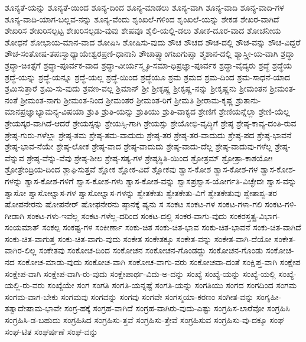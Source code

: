 {ಶೂನ್ಯತೆ-ಯನ್ನು
ಶೂನ್ಯತೆ-ಯಿಂದ
ಶೂನ್ಯ-ದಿಂದ
ಶೂನ್ಯ-ಮಾಡಲು
ಶೂನ್ಯ-ವಾಗಿ
ಶೂನ್ಯ-ವಾದಿ
ಶೂನ್ಯ-ವಾದಿ-ಗಳ
ಶೂನ್ಯ-ವಾದಿ-ಯಾಗ-ಬಲ್ಲವ-ನನ್ನು
ಶೂನ್ಯ-ವೆಂದು
ಶೃಂಖಲೆ-ಗಳಿಂದ
ಶೃಂಖಲೆ-ಯನ್ನು
ಶೇಕಡ
ಶೇಖರ-ವಾಗಿದೆ
ಶೇಖರಿಸ
ಶೇಖರಿಸಲ್ಪಟ್ಟ
ಶೇಖರಿಸಲ್ಪಡು-ವುವು
ಶೇಷವೂ
ಶೈಲಿ-ಯಲ್ಲಿ-ಡಲು
ಶೋಕ-ದೂರ-ವಾದ
ಶೋಚನೀಯ
ಶೋಧನೆ
ಶೋಭಾಯ-ಮಾನ-ವಾದ
ಶೋಷಿಸಿ
ಶೋಷಿಸು-ವುದು
ಶೌಚ
ಶೌಚದ
ಶೌಚ-ದಲ್ಲಿ
ಶೌಚ-ವನ್ನು
ಶೌಚ-ವಿದ್ದರೆ
ಶೌಚ-ಸಂತೋಷ-ತಪಃಸ್ವಾಧ್ಯಾಯೇಶ್ವರಪ್ರಣಿ-ಧಾನಾನಿ
ಶೌಚಾತ್ಸ್ವಾಂಗಜುಗುಪ್ಸಾ
ಶ್ಮಶಾನ-ದಲ್ಲಿ
ಶ್ಯಾಸ್ತ್ರೀ-ಯ-ವಾಗಿ
ಶ್ರದ್ಧಾ
ಶ್ರದ್ಧಾ-ಚಿಕಿತ್ಸೆಗೆ
ಶ್ರದ್ಧಾ-ಪೂರ್ವಕ-ವಾದ
ಶ್ರದ್ಧಾ-ವೀರ್ಯಸ್ಮೃತಿ-ಸಮಾ-ಧಿಪ್ರಜ್ಞಾ-ಪೂರ್ವಕ
ಶ್ರದ್ಧಾ-ವೈದ್ಯರು
ಶ್ರದ್ಧೆ
ಶ್ರದ್ಧೆಯ
ಶ್ರದ್ಧೆ-ಯನ್ನು
ಶ್ರದ್ಧೆ-ಯನ್ನೂ
ಶ್ರದ್ಧೆ-ಯಲ್ಲ
ಶ್ರದ್ಧೆ-ಯಿಂದ
ಶ್ರದ್ಧೆಯೂ
ಶ್ರಮ
ಶ್ರಮದ
ಶ್ರಮ-ದಿಂದ
ಶ್ರಮ-ಸಾಧನೆ-ಯಾದ
ಶ್ರಮಿಸುತ್ತಾರೆ
ಶ್ರಮಿ-ಸು-ವುದು
ಶ್ರವಣ-ವಲ್ಲ
ಶ್ರಿಮಾನ್
ಶ್ರೀ
ಶ್ರೀಕೃಷ್ಣ
ಶ್ರೀಕೃಷ್ಣ-ನನ್ನು
ಶ್ರೀಕೃಷ್ಣನು
ಶ್ರೀಮಂತನ
ಶ್ರೀಮಂತ-ನಂತೆ
ಶ್ರೀಮಂತ-ನಾಗು
ಶ್ರೀಮಂತ-ನಿಂದ
ಶ್ರೀಮಂತರ
ಶ್ರೀಮಂತ-ರಿಗೆ
ಶ್ರೀಮತಿ
ಶ್ರೀರಾಮ-ಕೃಷ್ಣ
ಶ್ರುತಾನು-ಮಾನಪ್ರಜ್ಞಾಭ್ಯಾಮನ್ಯ-ವಿಷಯಾ
ಶ್ರುತಿ
ಶ್ರುತಿ-ಯನ್ನು
ಶ್ರುತಿಯು
ಶ್ರುತಿ-ವಾಕ್ಯದ
ಶ್ರೇಣಿಗೆ
ಶ್ರೇಣಿಯನ್ನೆಲ್ಲಾ
ಶ್ರೇಣಿ-ಯೆಲ್ಲ
ಶ್ರೇಯಸ್ಕರ-ವಾಗಿದೆ-ಆದರೆ
ಶ್ರೇಯಸ್ಸನ್ನು
ಶ್ರೇಯಸ್ಸಿ-ಗಾಗಿ
ಶ್ರೇಯಸ್ಸು
ಶ್ರೇಯೋಭಿ-ವೃದ್ಧಿಗೆ
ಶ್ರೇಷ್ಠ
ಶ್ರೇಷ್ಠ-ಕಾವ್ಯ-ದಂತಿ-ರುವ
ಶ್ರೇಷ್ಠ-ಗುರು-ಗಳೆಲ್ಲಾ
ಶ್ರೇಷ್ಠ-ತಮ
ಶ್ರೇಷ್ಠ-ತಮ-ವಾದುದು
ಶ್ರೇಷ್ಠ-ತರ
ಶ್ರೇಷ್ಠ-ತರ-ವಾದುದು
ಶ್ರೇಷ್ಠ-ಪದ
ಶ್ರೇಷ್ಠ-ಭಾವನೆ
ಶ್ರೇಷ್ಠ-ಭಾವ-ನೆಯೇ
ಶ್ರೇಷ್ಠ-ಲೋಕ
ಶ್ರೇಷ್ಠ-ವಾದ
ಶ್ರೇಷ್ಠ-ವಾದುದು
ಶ್ರೇಷ್ಠ-ವಾದು-ದೆಲ್ಲ
ಶ್ರೇಷ್ಠ-ವಾದುವು-ಗಳೆಲ್ಲ
ಶ್ರೇಷ್ಠ-ವೆನ್ನುವ
ಶ್ರೇಷ್ಠ-ವೆನ್ನು-ವೆವು
ಶ್ರೇಷ್ಠ-ಶೀಲ
ಶ್ರೇಷ್ಠ-ಸತ್ಯ-ಗಳ
ಶ್ರೇಷ್ಠಸ್ಥಿತಿ-ಯಿಂದ
ಶ್ರೋತ್ರಮ್
ಶ್ರೋತ್ರಾ-ಕಾಶಯೋಃ
ಶ್ರೋತ್ರೇಂದ್ರಿಯ-ದಿಂದ
ಶ್ಲಾಘಿಸುತ್ತವೆ
ಶ್ಲೋಕ
ಶ್ಲೋಕ-ವಿದೆ
ಶ್ಲೋಕವು
ಶ್ವಾಸ-ಕೋಶ
ಶ್ವಾಸ-ಕೋಶ-ಗಳ
ಶ್ವಾಸ-ಕೋಶ-ಗಳನ್ನು
ಶ್ವಾಸ-ಕೋಶ-ಗಳಿಗೆ
ಶ್ವಾಸ-ಕೋಶ-ಗಳು
ಶ್ವಾಸ-ಕೋಶ-ವನ್ನು
ಶ್ವಾಸಪ್ರಶ್ವಾಸ-ಯೋರ್ಗತಿ-ವಿಚ್ಛೇದಃ
ಶ್ವಾಸ-ವನ್ನು
ಶ್ವಾಸೋ
ಶ್ವಾಸೋಛ್ವಾಸ-ಗಳ
ಶ್ವಾಸೋಛ್ವಾಸ-ಗಳನ್ನು
ಶ್ವೇತಕೇತು
ಶ್ವೇತಕೇತು-ವಿಗೆ
ಶ್ವೇತಕೇತುವು
ಶ್ವೇತಾಶ್ವ-ತರ
ಷೋಪನೇರನು
ಷೋಪನೇರ್
ಷೋಫನೇರನು
ಷ್ಠಾನಕ್ಕೆ
ಷ್ಯನು
ಸ
ಸಂಕಟ
ಸಂಕಟ-ಗಳ
ಸಂಕಟ-ಗಳಾ-ಗಲಿ
ಸಂಕಟ-ಗಳಿ-ಗೀಡಾಗಿ
ಸಂಕಟ-ಗಳು-ಇವೆಲ್ಲ
ಸಂಕಟ-ಗಳೆಲ್ಲ-ದರಿಂದ
ಸಂಕಟ-ದಲ್ಲಿ
ಸಂಕರ-ವಾಗು-ವುದು
ಸಂಕರಸ್ತತ್ಪ್ರ-ವಿಭಾಗ-ಸಂಯಮಾತ್
ಸಂಕಲ್ಪ
ಸಂಕಷ್ಟ-ಗಳ
ಸಂಕೀರ್ಣಾ
ಸಂಕು-ಚಿತ
ಸಂಕು-ಚಿತ-ಭಾವ
ಸಂಕು-ಚಿತ-ಭಾವನೆ
ಸಂಕು-ಚಿತ-ವಾಗಿದೆ
ಸಂಕು-ಚಿತ-ವಾಗುತ್ತ
ಸಂಕು-ಚಿತ-ವಾಗು-ವುದು
ಸಂಕೇತ
ಸಂಕೇತಕ್ಕೂ
ಸಂಕೇತ-ವನ್ನು
ಸಂಕೇತ-ವಾಗಿ-ದೆಯೋ
ಸಂಕೇತ-ವಾಗಿರ-ಲಿಲ್ಲ
ಸಂಕೇತವು
ಸಂಕೋಚ-ದಿಂದ
ಸಂಕೋಚನ
ಸಂಕೋಚನ-ಗೊಂಡದ್ದು
ಸಂಕೋಚನ-ಗೊಂಡು
ಸಂಕೋಚ-ನದ
ಸಂಕೋಚ-ಮಾಡು-ವುದು
ಸಂಕೋಚ-ವಾಗಿ
ಸಂಕೋಚ-ವಾಗು-ವರು
ಸಂಕೋಚವಾ-ದಂತೆ
ಸಂಕ್ಷಿಪ್ತ-ವಾಗಿ
ಸಂಕ್ಷೇಪ
ಸಂಕ್ಷೇಪ-ವಾಗಿ
ಸಂಕ್ಷೇಪ-ವಾಗಿ-ರು-ವುದು
ಸಂಕ್ಷೇಪಾರ್ಥ-ವಿದು-ಅ-ದನ್ನು
ಸಂಖ್ಯೆ
ಸಂಖ್ಯೆ-ಯನ್ನು
ಸಂಖ್ಯೆ-ಯಲ್ಲಿ
ಸಂಖ್ಯೆ-ಯಲ್ಲಿ-ರು-ವರು
ಸಂಖ್ಯೆಯೇ
ಸಂಗ
ಸಂಗತಿ
ಸಂಗತಿ-ಯನ್ನಷ್ಟೆ
ಸಂಗತಿ-ಯನ್ನು
ಸಂಗತಿಯು
ಸಂಗದ
ಸಂಗದಿಂದ
ಸಂಗಮ
ಸಂಗಮ-ವಾಗ-ಬೇಕು
ಸಂಗಮವು
ಸಂಗವನ್ನು
ಸಂಗವು
ಸಂಗವೇ
ಸಂಗಸ್ಮಯಾ-ಕರಣಂ
ಸಂಗೀತ-ವನ್ನು
ಸಂಗೃಹೀ-ತತ್ವಾದೇಷಾಮ-ಭಾವೇ
ಸಂಗ್ರ-ಹಕ್ಕೆ
ಸಂಗ್ರಹ-ವಾಗಿದೆ
ಸಂಗ್ರಹ-ವಾಗಿರು-ವುದು-ಎಷ್ಟು
ಸಂಗ್ರಹಿಸ-ಲಾರೆವೋ
ಸಂಗ್ರಹಿಸಿ
ಸಂಗ್ರಹಿಸಿ-ಡ-ಬಹುದು
ಸಂಗ್ರಹಿಸಿದ
ಸಂಗ್ರಹಿಸು-ತ್ತವೆ
ಸಂಗ್ರಹಿಸು-ತ್ತೇವೆ
ಸಂಗ್ರಹಿಸುವ
ಸಂಗ್ರಹಿಸು-ವು-ದಕ್ಕೂ
ಸಂಘ
ಸಂಘ-ಟಿತ
ಸಂಘರ್ಷಣೆ
ಸಂಘ-ವನ್ನು
}

